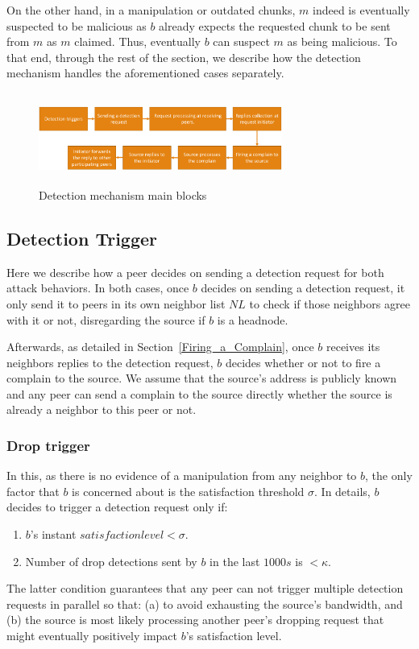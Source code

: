 On the other hand, in a manipulation or outdated chunks, $m$ indeed is eventually suspected to be malicious as $b$ already expects the requested chunk to be sent from $m$ as $m$ claimed.
Thus, eventually $b$ can suspect $m$ as being malicious.
To that end, through the rest of the section, we describe how the detection mechanism handles the aforementioned cases separately.

\begin{figure}
 \centering
 \includegraphics[width=8cm,height=3cm]{./Figures/detection-blocks.eps}
  \caption{Detection mechanism main blocks}
\label{detection-blocks} 
\end{figure}

\subsection{Detection Trigger}
Here we describe how a peer decides on sending a detection request for both attack behaviors.
In both cases, once $b$ decides on sending a detection request, it only send it to peers in its own neighbor list $NL$ to check if those neighbors agree with it or not, disregarding the source if $b$ is a headnode.

Afterwards, as detailed in Section~\ref{Firing_a_Complain}, once $b$ receives its neighbors replies to the detection request, $b$ decides whether or not to fire a complain to the source.
We assume that the source's address is publicly known and any peer can send a complain to the source directly whether the source is already a neighbor to this peer or not.
\subsubsection*{Drop trigger}
In this, as there is no evidence of a manipulation from any neighbor to $b$, the only factor that $b$ is concerned about is the satisfaction threshold $\sigma$.
In details, $b$ decides to trigger a detection request only if:
\begin{enumerate}
 \item $b$'s instant $satisfaction level < \sigma$.
 \item Number of drop detections sent by $b$ in the last $1000s$ is $< \kappa$.
\end{enumerate}
The latter condition guarantees that any peer can not trigger multiple detection requests in parallel so that: (a) to avoid exhausting the source's bandwidth, and (b) the source is most likely processing another peer's dropping request that might eventually positively impact $b$'s satisfaction level.

